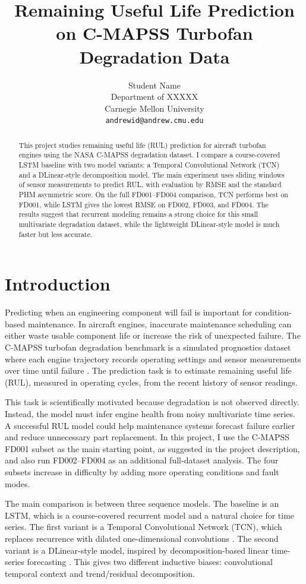 \documentclass[10pt]{article}
\title{Remaining Useful Life Prediction on C-MAPSS Turbofan Degradation Data}
\author{
Student Name \\
Department of XXXXX \\
Carnegie Mellon University \\
\texttt{andrewid@andrew.cmu.edu}
}
\date{}
\begin{document}
\maketitle

\begin{abstract}
This project studies remaining useful life (RUL) prediction for aircraft turbofan engines using the NASA C-MAPSS degradation dataset. I compare a course-covered LSTM baseline with two model variants: a Temporal Convolutional Network (TCN) and a DLinear-style decomposition model. The main experiment uses sliding windows of sensor measurements to predict RUL, with evaluation by RMSE and the standard PHM asymmetric score. On the full FD001--FD004 comparison, TCN performs best on FD001, while LSTM gives the lowest RMSE on FD002, FD003, and FD004. The results suggest that recurrent modeling remains a strong choice for this small multivariate degradation dataset, while the lightweight DLinear-style model is much faster but less accurate.
\end{abstract}

\section{Introduction}

Predicting when an engineering component will fail is important for condition-based maintenance. In aircraft engines, inaccurate maintenance scheduling can either waste usable component life or increase the risk of unexpected failure. The C-MAPSS turbofan degradation benchmark is a simulated prognostics dataset where each engine trajectory records operating settings and sensor measurements over time until failure \cite{saxena2008damage}. The prediction task is to estimate remaining useful life (RUL), measured in operating cycles, from the recent history of sensor readings.

This task is scientifically motivated because degradation is not observed directly. Instead, the model must infer engine health from noisy multivariate time series. A successful RUL model could help maintenance systems forecast failure earlier and reduce unnecessary part replacement. In this project, I use the C-MAPSS FD001 subset as the main starting point, as suggested in the project description, and also run FD002--FD004 as an additional full-dataset analysis. The four subsets increase in difficulty by adding more operating conditions and fault modes.

The main comparison is between three sequence models. The baseline is an LSTM, which is a course-covered recurrent model and a natural choice for time series. The first variant is a Temporal Convolutional Network (TCN), which replaces recurrence with dilated one-dimensional convolutions \cite{bai2018tcn}. The second variant is a DLinear-style model, inspired by decomposition-based linear time-series forecasting \cite{zeng2023dlinear}. This gives two different inductive biases: convolutional temporal context and trend/residual decomposition.
\end{document}
